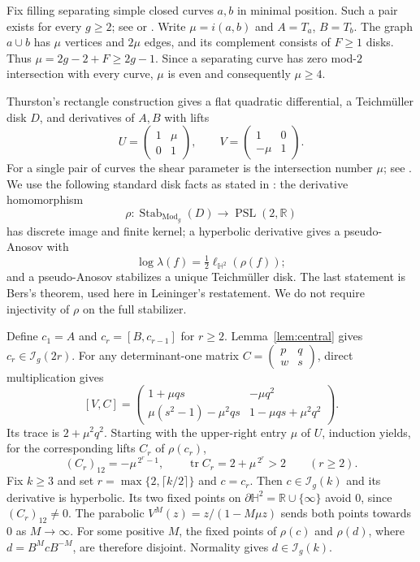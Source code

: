 \documentclass[11pt]{article}
\theoremstyle{remark}\newtheorem*{remark}{Remark}
\newcommand{\Mod}{\operatorname{Mod}}
\newcommand{\tr}{\operatorname{tr}}
\newcommand{\PSL}{\operatorname{PSL}}
\newcommand{\HH}{\mathbb H^2}
\newcommand{\I}{\mathcal I}
\begin{document}
Fix filling separating simple closed curves $a,b$ in minimal position.
Such a pair exists for every $g\ge2$; see
\cite[\S7.2]{Farb} or \cite[Lemma 2.2]{AT}.
Write $\mu=i(a,b)$ and $A=T_a$, $B=T_b$.
The graph $a\cup b$ has $\mu$ vertices and $2\mu$ edges, and its
complement consists of $F\ge1$ disks. Thus
$\mu=2g-2+F\ge2g-1$. Since a separating curve has zero mod-$2$
intersection with every curve, $\mu$ is even and consequently $\mu\ge4$.

Thurston's rectangle construction gives a flat quadratic differential,
a Teichm\"uller disk $D$, and derivatives of $A,B$ with lifts
\begin{equation}\label{eq:AB}
 U=\begin{pmatrix}1&\mu\\0&1\end{pmatrix},\qquad
 V=\begin{pmatrix}1&0\\-\mu&1\end{pmatrix}.
\end{equation}
For a single pair of curves the shear parameter is the intersection
number $\mu$; see \cite[\S5.1 and Lemma 6.3]{Leininger}.
We use the following standard disk facts as stated in
\cite[Theorems 3.1--3.2]{Leininger}: the derivative homomorphism
\[
 \rho:\operatorname{Stab}_{\Mod_g}(D)\longrightarrow\PSL(2,\mathbb R)
\]
has discrete image and finite kernel; a hyperbolic derivative gives a
pseudo-Anosov with
\begin{equation}\label{eq:normalization}
 \log\lambda(f)=\tfrac12\ell_{\HH}(\rho(f));
\end{equation}
and a pseudo-Anosov stabilizes a unique Teichm\"uller disk.
The last statement is Bers's theorem, used here in Leininger's
restatement. We do not require injectivity of $\rho$ on the full stabilizer.

Define $c_1=A$ and $c_r=[B,c_{r-1}]$ for $r\ge2$.
Lemma~\ref{lem:central} gives $c_r\in\I_g(2r)$.
For any determinant-one matrix $C=\left(\begin{smallmatrix}p&q\\w&s\end{smallmatrix}\right)$,
direct multiplication gives
\[
 [V,C]=\begin{pmatrix}
 1+\mu qs&-\mu q^2\\
 \mu(s^2-1)-\mu^2qs&1-\mu qs+\mu^2q^2
 \end{pmatrix}.
\]
Its trace is $2+\mu^2q^2$. Starting with the upper-right entry $\mu$ of
$U$, induction yields, for the corresponding lifts $C_r$ of $\rho(c_r)$,
\begin{equation}\label{eq:deep}
 (C_r)_{12}=-\mu^{\,2^r-1},\qquad
 \tr C_r=2+\mu^{\,2^r}>2 \qquad(r\ge2).
\end{equation}
Fix $k\ge3$ and set $r=\max\{2,\lceil k/2\rceil\}$ and $c=c_r$.
Then $c\in\I_g(k)$ and its derivative is hyperbolic.
Its two fixed points on $\partial\HH=\mathbb R\cup\{\infty\}$ avoid $0$,
since $(C_r)_{12}\ne0$. The parabolic
$V^M(z)=z/(1-M\mu z)$ sends both points towards $0$ as $M\to\infty$.
For some positive $M$, the fixed points of $\rho(c)$ and
$\rho(d)$, where $d=B^McB^{-M}$, are therefore disjoint.
Normality gives $d\in\I_g(k)$.
\end{document}
